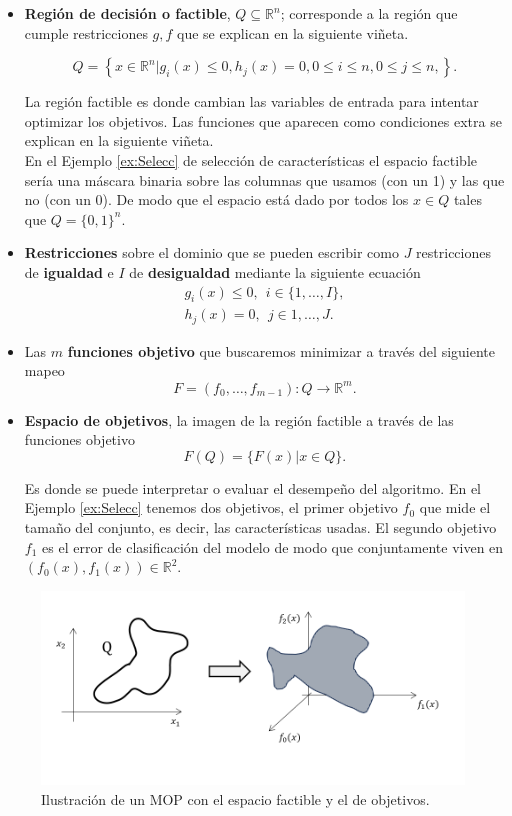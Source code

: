 \begin{itemize}
    \item \textbf{Región de decisión o factible}, $Q\subseteq \mathbb{R}^n$; corresponde a la región que cumple restricciones $g,f$ que se explican en la siguiente viñeta. 
    
    $$ Q=\left\{x\in \mathbb{R}^n|g_i(x)\leq 0, h_j(x)=0 , 0\leq i \leq n, 0\leq j \leq n,\right\}.$$ 

    La región factible es donde cambian las variables de entrada para intentar optimizar los objetivos. Las funciones que aparecen como condiciones extra se explican en la siguiente viñeta.\\ En el Ejemplo \ref{ex:Selecc} de selección de características  el espacio factible sería una máscara binaria sobre las columnas que usamos (con un 1) y las que no (con un 0). De modo que el espacio está dado por todos los $x\in Q$ tales que  $Q=\{0,1\}^n$.
    \item \textbf{Restricciones} sobre el dominio que se pueden escribir como $J$ restricciones de \textbf{igualdad} e $I$ de \textbf{desigualdad} mediante la siguiente ecuación  
    \begin{align*}
        g_i(x)\leq 0, \ \ i\in\{1,\ldots,I\},\\  h_j(x)=0 ,\ \ j\in{1,\ldots,J}.
    \end{align*} 
    \item Las $m$ \textbf{funciones objetivo} que buscaremos minimizar a través del siguiente mapeo$$ F=(f_0,\ldots,f_{m-1}):Q\rightarrow \mathbb{R}^m. $$
    \item \textbf{Espacio de objetivos}, la imagen de la región factible a través de las funciones objetivo 
     $$F(Q)=\{F(x) | x \in Q\}.$$
     
    Es donde se puede interpretar o evaluar el desempeño del algoritmo. En el Ejemplo \ref{ex:Selecc} tenemos dos objetivos, el primer objetivo $f_0$ que mide el tamaño del conjunto, es decir, las características usadas. El segundo objetivo $f_1$ es el error de clasificación del modelo de modo que conjuntamente viven en $(f_0(x),f_1(x))\in \mathbb{R}^2$.
    
\end{itemize}

\begin{figure}[H]
    \centering
    \includegraphics[width=\textwidth]{Figuras/obj_dec.png}
    \caption[Ilustración de un MOP]{Ilustración de un MOP con el espacio factible y el de objetivos. }
    \label{fig:dec_obj}
\end{figure}

